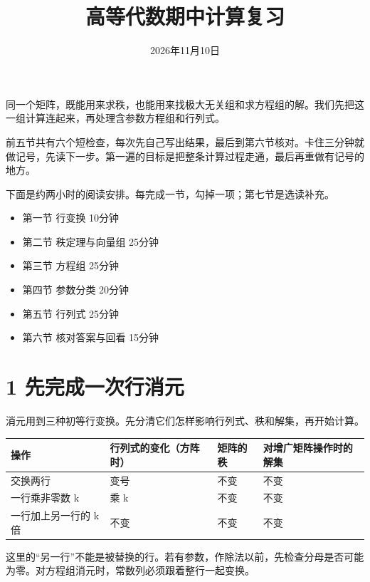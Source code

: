 \documentclass[
  11pt,
  a4paper,
  fontset=fandol]{ctexart}
\title{高等代数期中计算复习}
\author{}
\date{2026年11月10日}
\makeatletter
\newcounter{none} %
\providecommand{\tightlist}{%
  \setlength{\itemsep}{0pt}\setlength{\parskip}{0pt}}
\renewcommand{\maketitle}{%
  \thispagestyle{plain}%
  \begin{center}
    {\Large\bfseries\@title\par}\vspace{0.4em}
    {\small\@date\par}
  \end{center}\vspace{0.4em}
}
\makeatother
\begin{document}
\maketitle

同一个矩阵，既能用来求秩，也能用来找极大无关组和求方程组的解。我们先把这一组计算连起来，再处理含参数方程组和行列式。

前五节共有六个短检查，每次先自己写出结果，最后到第六节核对。卡住三分钟就做记号，先读下一步。第一遍的目标是把整条计算过程走通，最后再重做有记号的地方。

下面是约两小时的阅读安排。每完成一节，勾掉一项；第七节是选读补充。

\begin{itemize}
\tightlist
\item[$\square$]
  第一节 行变换 10分钟
\item[$\square$]
  第二节 秩定理与向量组 25分钟
\item[$\square$]
  第三节 方程组 25分钟
\item[$\square$]
  第四节 参数分类 20分钟
\item[$\square$]
  第五节 行列式 25分钟
\item[$\square$]
  第六节 核对答案与回看 15分钟
\end{itemize}


\section{1
先完成一次行消元}\label{1-ux5148ux5b8cux6210ux4e00ux6b21ux884cux6d88ux5143}

消元用到三种初等行变换。先分清它们怎样影响行列式、秩和解集，再开始计算。

{\def\LTcaptype{none} %
\begin{longtable}[]{@{}llll@{}}
\toprule\noalign{}
操作 & 行列式的变化（方阵时） & 矩阵的秩 & 对增广矩阵操作时的解集 \\
\midrule\noalign{}
\endhead
\bottomrule\noalign{}
\endlastfoot
交换两行 & 变号 & 不变 & 不变 \\
一行乘非零数 k & 乘 k & 不变 & 不变 \\
一行加上另一行的 k 倍 & 不变 & 不变 & 不变 \\
\end{longtable}
}

这里的``另一行''不能是被替换的行。若有参数，作除法以前，先检查分母是否可能为零。对方程组消元时，常数列必须跟着整行一起变换。
\end{document}

